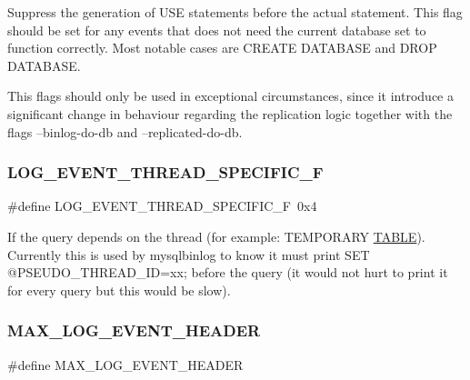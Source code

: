 Suppress the generation of \textquotesingle{}U\+SE\textquotesingle{} statements before the actual statement. This flag should be set for any events that does not need the current database set to function correctly. Most notable cases are \textquotesingle{}C\+R\+E\+A\+TE D\+A\+T\+A\+B\+A\+SE\textquotesingle{} and \textquotesingle{}D\+R\+OP D\+A\+T\+A\+B\+A\+SE\textquotesingle{}.

This flags should only be used in exceptional circumstances, since it introduce a significant change in behaviour regarding the replication logic together with the flags --binlog-\/do-\/db and --replicated-\/do-\/db. \mbox{\label{group__Replication_ga1006353b6090b4af079bd4c9d1728eab}} 
\subsubsection{\texorpdfstring{L\+O\+G\+\_\+\+E\+V\+E\+N\+T\+\_\+\+T\+H\+R\+E\+A\+D\+\_\+\+S\+P\+E\+C\+I\+F\+I\+C\+\_\+F}{LOG\_EVENT\_THREAD\_SPECIFIC\_F}}
{\footnotesize\ttfamily \#define L\+O\+G\+\_\+\+E\+V\+E\+N\+T\+\_\+\+T\+H\+R\+E\+A\+D\+\_\+\+S\+P\+E\+C\+I\+F\+I\+C\+\_\+F~0x4}

If the query depends on the thread (for example\+: T\+E\+M\+P\+O\+R\+A\+RY \mbox{\hyperlink{structTABLE}{T\+A\+B\+LE}}). Currently this is used by mysqlbinlog to know it must print S\+ET @P\+S\+E\+U\+D\+O\+\_\+\+T\+H\+R\+E\+A\+D\+\_\+\+ID=xx; before the query (it would not hurt to print it for every query but this would be slow). \mbox{\label{group__Replication_gaabd2be8dba3c484de0d23c2adcb4a474}} 
\subsubsection{\texorpdfstring{M\+A\+X\+\_\+\+L\+O\+G\+\_\+\+E\+V\+E\+N\+T\+\_\+\+H\+E\+A\+D\+ER}{MAX\_LOG\_EVENT\_HEADER}}
{\footnotesize\ttfamily \#define M\+A\+X\+\_\+\+L\+O\+G\+\_\+\+E\+V\+E\+N\+T\+\_\+\+H\+E\+A\+D\+ER}

